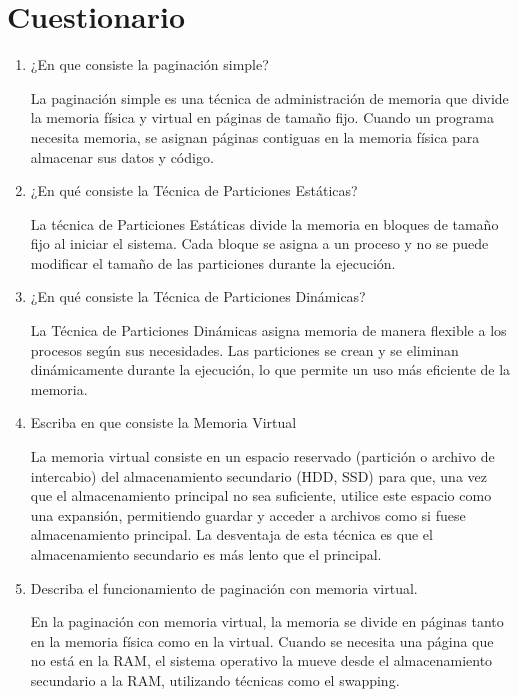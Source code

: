 \documentclass[12pt, a4paper]{article} %
\begin{document}
\clearpage
\section{Cuestionario}

\begin{enumerate}
	\item ¿En que consiste la paginación simple?

		La paginación simple es una técnica de administración de memoria que divide la memoria física y virtual en páginas de tamaño fijo. Cuando un programa necesita memoria, se asignan páginas contiguas en la memoria física para almacenar sus datos y código.

	\item ¿En qué consiste la Técnica de Particiones Estáticas?

		La técnica de Particiones Estáticas divide la memoria en bloques de tamaño fijo al iniciar el sistema. Cada bloque se asigna a un proceso y no se puede modificar el tamaño de las particiones durante la ejecución.

	\item ¿En qué consiste la Técnica de Particiones Dinámicas?

		La Técnica de Particiones Dinámicas asigna memoria de manera flexible a los procesos según sus necesidades. Las particiones se crean y se eliminan dinámicamente durante la ejecución, lo que permite un uso más eficiente de la memoria.

	\item Escriba en que consiste la Memoria Virtual

		La memoria virtual consiste en un espacio reservado (partición o archivo de intercabio) del almacenamiento secundario (HDD, SSD) para que, una vez que el almacenamiento principal no sea suficiente, utilice este espacio como una expansión, permitiendo guardar y acceder a archivos como si fuese almacenamiento principal. La desventaja de esta técnica es que el almacenamiento secundario es más lento que el principal.

	\item Describa el funcionamiento de paginación con memoria virtual.

		En la paginación con memoria virtual, la memoria se divide en páginas tanto en la memoria física como en la virtual. Cuando se necesita una página que no está en la RAM, el sistema operativo la mueve desde el almacenamiento secundario a la RAM, utilizando técnicas como el swapping.


\end{enumerate}
\end{document}
